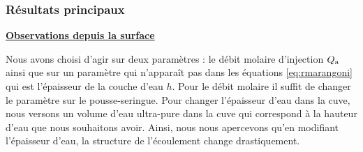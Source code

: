 \documentclass[french, 10pt]{article}
\begin{document}
\subsubsection{Résultats principaux}

\noindent\underline{\textbf{Observations depuis la surface}}\medskip

Nous avons choisi d'agir sur deux paramètres : le débit molaire d'injection $Q_{\rm a}$ ainsi que sur un paramètre qui n'apparaît pas dans les équations \eqref{eq:rmarangoni} qui est l'épaisseur de la couche d'eau $h$. Pour le débit molaire il suffit de changer le paramètre sur le pousse-seringue. Pour changer l'épaisseur d'eau dans la cuve, nous versons un volume d'eau ultra-pure dans la cuve qui correspond à la hauteur d'eau que nous souhaitons avoir. Ainsi, nous nous apercevons qu'en modifiant l'épaisseur d'eau, la structure de l'écoulement change drastiquement.\medskip
\end{document}
